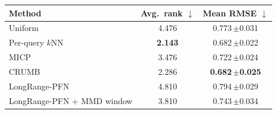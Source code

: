 \begin{tabular}{lcc}
\toprule
Method & Avg.\ rank $\downarrow$ & Mean RMSE $\downarrow$\\
\midrule
Uniform & 4.476 & 0.773\,{\scriptsize$\pm$0.031}\\
Per-query $k$NN & \textbf{2.143} & 0.682\,{\scriptsize$\pm$0.022}\\
MICP & 3.476 & 0.722\,{\scriptsize$\pm$0.024}\\
CRUMB & 2.286 & \textbf{0.682\,{\scriptsize$\pm$0.025}}\\
LongRange-PFN & 4.810 & 0.794\,{\scriptsize$\pm$0.029}\\
LongRange-PFN + MMD window & 3.810 & 0.743\,{\scriptsize$\pm$0.034}\\
\bottomrule
\end{tabular}
